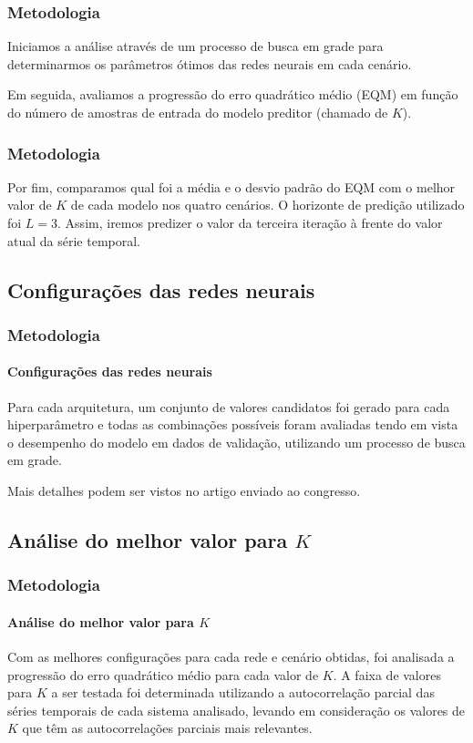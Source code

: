 \documentclass[aspectratio=169]{beamer}
\begin{document}
\begin{frame}
\frametitle{Metodologia}
\justifying Iniciamos a análise através de um processo de busca em grade para determinarmos os parâmetros ótimos das redes neurais em cada cenário. 

Em seguida, avaliamos a progressão do erro quadrático médio (EQM) em função do número de amostras de entrada do modelo preditor (chamado de $K$). 
\end{frame}

\begin{frame}
\frametitle{Metodologia}
\justifying Por fim, comparamos qual foi a média e o desvio padrão do EQM com o melhor valor de $K$ de cada modelo nos quatro cenários. O horizonte de predição utilizado foi $L=3$. Assim, iremos predizer o valor da terceira iteração à frente do valor atual da série temporal.
\end{frame}

\subsection{Configurações das redes neurais}

\begin{frame}
\frametitle{Metodologia}
\framesubtitle{Configurações das redes neurais}
\justifying Para cada arquitetura, um conjunto de valores candidatos foi gerado para cada hiperparâmetro e todas as combinações possíveis foram avaliadas tendo em vista o desempenho do modelo em dados de validação, utilizando um processo de busca em grade.

Mais detalhes podem ser vistos no artigo enviado ao congresso.
\end{frame}

\subsection{Análise do melhor valor para $K$}

\begin{frame}
\frametitle{Metodologia}
\framesubtitle{Análise do melhor valor para $K$}
\justifying 

Com as melhores configurações para cada rede e cenário obtidas, foi analisada a progressão do erro quadrático médio para cada valor de $K$. A faixa de valores para $K$ a ser testada foi determinada utilizando a autocorrelação parcial das séries temporais de cada sistema analisado, levando em consideração os valores de $K$ que têm as autocorrelações parciais mais relevantes.
\end{frame}
\end{document}

